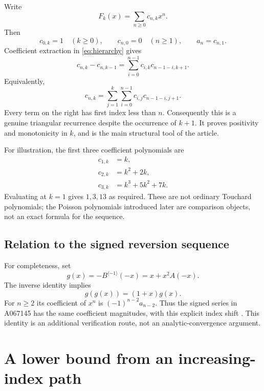 \documentclass[11pt]{article}
\numberwithin{equation}{section}
\theoremstyle{definition}
\theoremstyle{remark}
\begin{document}
Write
\[
 F_k(x)=\sum_{n\ge0}c_{n,k}x^n.
\]
Then
\begin{equation}\label{eq:boundary}
 c_{0,k}=1\quad(k\ge0),\qquad c_{n,0}=0\quad(n\ge1),
 \qquad a_n=c_{n,1}.
\end{equation}
Coefficient extraction in \eqref{eq:hierarchy} gives
\begin{equation}\label{eq:triangular}
 c_{n,k}-c_{n,k-1}
 =\sum_{i=0}^{n-1}c_{i,k}c_{n-1-i,k+1}.
\end{equation}
Equivalently,
\begin{equation}\label{eq:triangularsum}
 c_{n,k}=\sum_{j=1}^k\sum_{i=0}^{n-1}
                  c_{i,j}c_{n-1-i,j+1}.
\end{equation}
Every term on the right has first index less than $n$. Consequently this
is a genuine triangular recurrence despite the occurrence of $k+1$.
It proves positivity and monotonicity in $k$, and is the main structural
tool of the article.

For illustration, the first three coefficient polynomials are
\begin{align*}
 c_{1,k}&=k,\\
 c_{2,k}&=k^2+2k,\\
 c_{3,k}&=k^3+5k^2+7k.
\end{align*}
Evaluating at $k=1$ gives $1,3,13$ as required. These are not ordinary
Touchard polynomials; the Poisson polynomials introduced later are
comparison objects, not an exact formula for the sequence.

\subsection{Relation to the signed reversion sequence}

For completeness, set
\[
 g(x)=-B^{\langle-1\rangle}(-x)=x+x^2A(-x).
\]
The inverse identity implies
\[
 g(g(x))=(1+x)g(x).
\]
For $n\ge2$ its coefficient of $x^n$ is $(-1)^{n-2}a_{n-2}$.
Thus the signed series in A067145 has the same coefficient magnitudes,
with this explicit index shift \cite{oeis-a067145}. This identity is an
additional verification route, not an analytic-convergence argument.

\section{A lower bound from an increasing-index path}
\end{document}
